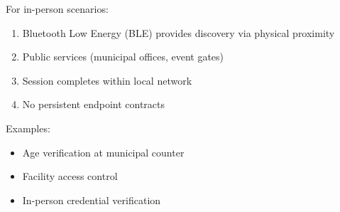 For in-person scenarios:
\begin{enumerate}
  \item Bluetooth Low Energy (BLE) provides discovery via physical proximity
  \item Public services (municipal offices, event gates)
  \item Session completes within local network
  \item No persistent endpoint contracts
\end{enumerate}

Examples:
\begin{itemize}
  \item Age verification at municipal counter
  \item Facility access control
  \item In-person credential verification
\end{itemize}

